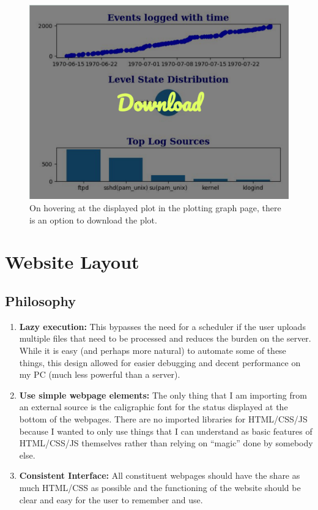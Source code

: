 \documentclass[11pt]{scrartcl}
\begin{document}
\begin{figure}
  
  \centering
  \includegraphics[width=0.8\linewidth]{images/downloadplot.png}
  \caption{On hovering at the displayed plot in the plotting graph page, there
  is an option to download the plot.}
  \label{downloadplot}

\end{figure}



\section{Website Layout}

\subsection{Philosophy}
\label{philo}

\begin{enumerate} 
  \item \textbf{Lazy execution:} This bypasses the need for a
  scheduler if the user uploads multiple files that need to be processed and
  reduces the burden on the server. While it is easy (and perhaps more natural)
  to automate some of these things, this design allowed for easier debugging and
  decent performance on my PC (much less powerful than a server).

  \item \textbf{Use simple webpage elements:} The only thing that I am
  importing from an external source is the caligraphic font for the status
  displayed at the bottom of the webpages. There are no imported libraries for 
  HTML/CSS/JS because I wanted to only use things that I can understand as basic
  features of HTML/CSS/JS themselves rather than relying on ``magic'' done by
  somebody else.

  \item \textbf{Consistent Interface:} All constituent webpages should have the
    share as much HTML/CSS as possible and the functioning of the website should
    be clear and easy for the user to remember and use.
\end{enumerate}
\end{document}
